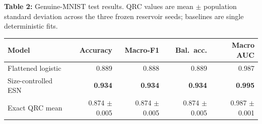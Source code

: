 \begin{center}
\begin{minipage}{\linewidth}
\centering\small
\textbf{Table 2:} Genuine-MNIST test results. QRC values are mean $\pm$ population standard deviation across the three frozen reservoir seeds; baselines are single deterministic fits.\par
\smallskip
\begin{tabular}{@{}lrrrr@{}}
\toprule
Model & Accuracy & Macro-F1 & Bal.\ acc. & Macro AUC \\
\midrule
Flattened logistic & 0.889 & 0.888 & 0.889 & 0.987 \\
Size-controlled ESN & \textbf{0.934} & \textbf{0.934} & \textbf{0.934} & \textbf{0.995} \\
Exact QRC mean & 0.874 $\pm$ 0.005 & 0.874 $\pm$ 0.005 & 0.874 $\pm$ 0.005 & 0.987 $\pm$ 0.001 \\
\bottomrule
\end{tabular}
\end{minipage}
\end{center}
